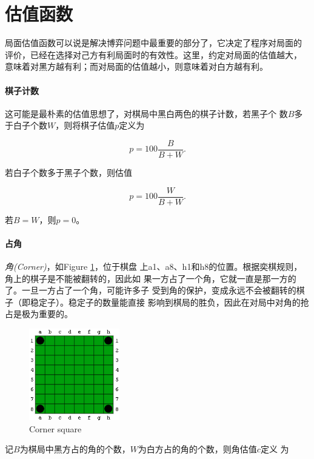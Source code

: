 \documentclass[oneside,a4paper]{article}
\begin{document}
\section{估值函数}
\label{sec:evaluator}

局面估值函数可以说是解决博弈问题中最重要的部分了，它决定了程序对局面的
评价，已经在选择对己方有利局面时的有效性。这里，约定对局面的估值越大，
意味着对黑方越有利；而对局面的估值越小，则意味着对白方越有利。

\paragraph{棋子计数}
这可能是最朴素的估值思想了，对棋局中黑白两色的棋子计数，若黑子个
数$B$多于白子个数$W$，则将棋子估值$p$定义为

\begin{equation}p = 100 \frac{B}{B+W}   \mathrm{ .}
\end{equation}

若白子个数多于黑子个数，则估值

\begin{equation}p = 100 \frac{W}{B+W}   \mathrm{ .}
\end{equation}

若$B = W$，则$p = 0$。

\paragraph{占角}
\emph{角(Corner)}，如Figure \ref{fig:corner}，位于棋盘
上a1、a8、h1和h8的位置。根据奕棋规则，角上的棋子是不能被翻转的，因此如
果一方占了一个角，它就一直是那一方的了。一旦一方占了一个角，可能许多子
受到角的保护，变成永远不会被翻转的棋子（即稳定子）。稳定子的数量能直接
影响到棋局的胜负，因此在对局中对角的抢占是极为重要的。

\begin{figure}[!hbp]
  \centering
  \includegraphics[height=4cm]{corner.png}
  \caption{Corner square}
  \label{fig:corner}
\end{figure}

记$B$为棋局中黑方占的角的个数，$W$为白方占的角的个数，则角估值$c$定义
为
\end{document}
